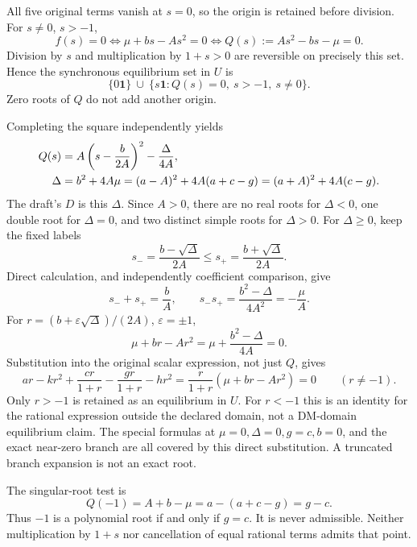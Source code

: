 \documentclass[11pt]{article}
\newcommand{\one}{\mathbf 1}
\begin{document}
All five original terms vanish at \(s=0\), so the origin is retained
before division. For \(s\ne0\), \(s>-1\),
\[
f(s)=0
\Longleftrightarrow \mu+bs-As^2=0
\Longleftrightarrow Q(s):=As^2-bs-\mu=0.
\]
Division by \(s\) and multiplication by \(1+s>0\) are reversible
on precisely this set. Hence the synchronous equilibrium set in \(U\) is
\begin{equation}\label{A02:set}
\{0\one\}\ \cup\ \{s\one:Q(s)=0,\ s>-1,\ s\ne0\}.
\end{equation}
Zero roots of \(Q\) do not add another origin.

Completing the square independently yields
\begin{align}
Q(s)&=A\left(s-\frac b{2A}\right)^2-\frac{\Delta}{4A},\notag\\
\Delta&=b^2+4A\mu=(a-A)^2+4A(a+c-g)
=(a+A)^2+4A(c-g).
\label{A02:disc}
\end{align}
The draft's \(D\) is this \(\Delta\). Since \(A>0\), there are
no real roots for \(\Delta<0\), one double root for \(\Delta=0\),
and two distinct simple roots for \(\Delta>0\).
For \(\Delta\ge0\), keep the fixed labels
\begin{equation}\label{A02:roots}
s_-=\frac{b-\sqrt{\Delta}}{2A}\le
s_+=\frac{b+\sqrt{\Delta}}{2A}.
\end{equation}
Direct calculation, and independently coefficient comparison, give
\begin{equation}\label{A02:vieta}
s_-+s_+=\frac bA,\qquad
s_-s_+=\frac{b^2-\Delta}{4A^2}=-\frac{\mu}{A}.
\end{equation}
For \(r=(b+\varepsilon\sqrt{\Delta})/(2A)\), \(\varepsilon=\pm1\),
\[
\mu+br-Ar^2=\mu+\frac{b^2-\Delta}{4A}=0.
\]
Substitution into the original scalar expression, not just \(Q\), gives
\begin{equation}\label{A02:residual}
ar-kr^2+\frac{cr}{1+r}-\frac{gr}{1+r}-hr^2
=\frac{r}{1+r}(\mu+br-Ar^2)=0\qquad(r\ne-1).
\end{equation}
Only \(r>-1\) is retained as an equilibrium in \(U\).
For \(r<-1\) this is an identity for the rational expression outside
the declared domain, not a DM-domain equilibrium claim.
The special formulas at \(\mu=0,\Delta=0,g=c,b=0\), and the exact
near-zero branch are all covered by this direct substitution.
A truncated branch expansion is not an exact root.

The singular-root test is
\begin{equation}\label{A02:minusone}
Q(-1)=A+b-\mu=a-(a+c-g)=g-c.
\end{equation}
Thus \(-1\) is a polynomial root if and only if \(g=c\).
It is never admissible. Neither multiplication by \(1+s\) nor
cancellation of equal rational terms admits that point.
\end{document}
